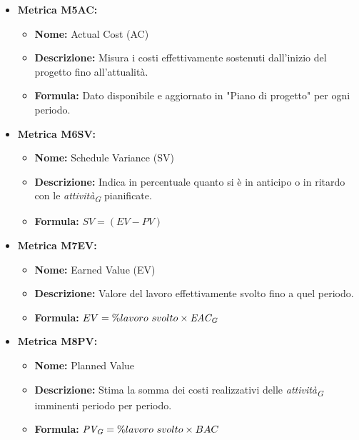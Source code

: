\begin{itemize}
    \item \textbf{Metrica M5AC:}
          \begin{itemize}
              \item \textbf{Nome:} Actual Cost (AC)
              \item \textbf{Descrizione:} Misura i costi effettivamente sostenuti dall’inizio del progetto fino all’attualità.
              \item \textbf{Formula:} Dato disponibile e aggiornato in "Piano di progetto" per ogni periodo.
          \end{itemize}

    \item \textbf{Metrica M6SV:}
          \begin{itemize}
              \item \textbf{Nome:} Schedule Variance (SV)
              \item \textbf{Descrizione:} Indica in percentuale quanto si è in anticipo o in ritardo con le \textit{attività}\textsubscript{\textit{G}} pianificate.
              \item \textbf{Formula:} $SV = (EV - PV)$
          \end{itemize}

    \item \textbf{Metrica M7EV:}
          \begin{itemize}
              \item \textbf{Nome:} Earned Value (EV)
              \item \textbf{Descrizione:} Valore del lavoro effettivamente svolto fino a quel periodo.
              \item \textbf{Formula:} $EV = \% lavoro \ svolto \times \textit{EAC}\textsubscript{\textit{G}}$
          \end{itemize}

    \item \textbf{Metrica M8PV:}
          \begin{itemize}
              \item \textbf{Nome:} Planned Value
              \item \textbf{Descrizione:} Stima la somma dei costi realizzativi delle \textit{attività}\textsubscript{\textit{G}} imminenti periodo per periodo.
              \item \textbf{Formula:} $\textit{PV}\textsubscript{\textit{G}} = \% lavoro \ svolto \times BAC$
          \end{itemize}


\end{itemize}
